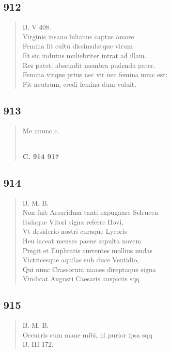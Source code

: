 \documentclass[11pt, a4paper]{report}
\begin{document}
            \subsection*{912}
      \begin{verse}
      B. V 408. \\ Virginis insano lulianus captus amore \\ Femina fit cultu dissimulatque virum \\ Et sic indutus muliebriter intrat ad illam. \\ Res patet, abscindit membra pudenda pater. \\ Femina virque prius nec vir nec femina nunc est: \\ Fit neutrum, credi femina dum voluit. \\ 
      \end{verse}
  
            \subsection*{913}
      \begin{verse}
      Me nnunc c. \\ 
        ﻿\pagebreak 
    \begin{center} \textbf{C. 914 917} \end{center} \marginpar{[343]} 
      \end{verse}
  
            \subsection*{914}
      \begin{verse}
      B. M. B. \\ Non fuit Arsacidum tanti expugnare Seleucen \\ Italaque Vltori signa referre Hovi, \\ Vt desiderio nostri curaque Lycoris \\ Heu iaceat menses paene sepulta novem \\ Pingit et Euphratis currentes mollius undas \\ Victricesque aquilas sub duce Ventidio, \\ Qui nunc Crassorum manes direptaque signa \\ Vindicat Augusti Caesaris auspiciis sqq \\ 
      \end{verse}
  
            \subsection*{915}
      \begin{verse}
      B. M. B. \\ Occurris cum mane mibi, ni purior ipsa sqq \\ B. III 172. \\ 
      \end{verse}
  
\end{document}
